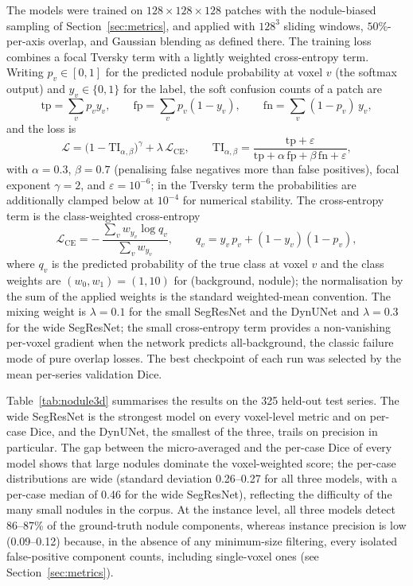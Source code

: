 The models were trained on $128 \times 128 \times 128$ patches with the nodule-biased sampling of Section~\ref{sec:metrics}, and applied with $128^3$ sliding windows, $50\%$-per-axis overlap, and Gaussian blending as defined there.
The training loss combines a focal Tversky term \cite{Abraham2019} with a lightly weighted cross-entropy term. Writing $p_v \in [0,1]$ for the predicted nodule probability at voxel $v$ (the softmax output) and $y_v \in \{0,1\}$ for the label, the soft confusion counts of a patch are
\begin{equation*}
\mathrm{tp} = \sum_v p_v y_v, \qquad
\mathrm{fp} = \sum_v p_v (1 - y_v), \qquad
\mathrm{fn} = \sum_v (1 - p_v)\, y_v,
\end{equation*}
and the loss is
\begin{equation*}
\mathcal{L} = \bigl(1 - \mathrm{TI}_{\alpha,\beta}\bigr)^{\gamma} + \lambda\, \mathcal{L}_{\mathrm{CE}},
\qquad
\mathrm{TI}_{\alpha,\beta} = \frac{\mathrm{tp} + \varepsilon}{\mathrm{tp} + \alpha\,\mathrm{fp} + \beta\,\mathrm{fn} + \varepsilon},
\end{equation*}
with $\alpha = 0.3$, $\beta = 0.7$ (penalising false negatives more than false positives), focal exponent $\gamma = 2$, and $\varepsilon = 10^{-6}$; in the Tversky term the probabilities are additionally clamped below at $10^{-4}$ for numerical stability. The cross-entropy term is the class-weighted cross-entropy
\begin{equation*}
\mathcal{L}_{\mathrm{CE}} = -\,\frac{\sum_v w_{y_v} \log q_v}{\sum_v w_{y_v}},
\qquad
q_v = y_v\, p_v + (1 - y_v)(1 - p_v),
\end{equation*}
where $q_v$ is the predicted probability of the true class at voxel $v$ and the class weights are $(w_0, w_1) = (1, 10)$ for (background, nodule); the normalisation by the sum of the applied weights is the standard weighted-mean convention. The mixing weight is $\lambda = 0.1$ for the small SegResNet and the DynUNet and $\lambda = 0.3$ for the wide SegResNet; the small cross-entropy term provides a non-vanishing per-voxel gradient when the network predicts all-background, the classic failure mode of pure overlap losses.
The best checkpoint of each run was selected by the mean per-series validation Dice.

Table~\ref{tab:nodule3d} summarises the results on the 325 held-out test series. The wide SegResNet is the strongest model on every voxel-level metric and on per-case Dice, and the DynUNet, the smallest of the three, trails on precision in particular. The gap between the micro-averaged and the per-case Dice of every model shows that large nodules dominate the voxel-weighted score; the per-case distributions are wide (standard deviation 0.26--0.27 for all three models, with a per-case median of 0.46 for the wide SegResNet), reflecting the difficulty of the many small nodules in the corpus. At the instance level, all three models detect 86--87\% of the ground-truth nodule components, whereas instance precision is low (0.09--0.12) because, in the absence of any minimum-size filtering, every isolated false-positive component counts, including single-voxel ones (see Section~\ref{sec:metrics}).

